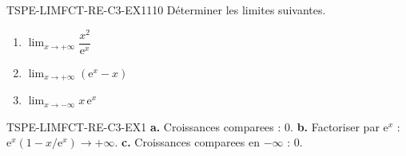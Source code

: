 

\begin{exercice}{TSPE-LIMFCT-RE-C3-EX1}{1}{10}
Déterminer les limites suivantes.
\begin{enumerate}
  \item $\lim_{x \to +\infty} \dfrac{x^2}{\mathrm{e}^x}$
  \item $\lim_{x \to +\infty} (\mathrm{e}^x - x)$
  \item $\lim_{x \to -\infty} x\,\mathrm{e}^x$
\end{enumerate}
\end{exercice}


\begin{corrige}{TSPE-LIMFCT-RE-C3-EX1}
\textbf{a.} Croissances comparees : $0$. \quad \textbf{b.} Factoriser par $\mathrm{e}^x$ : $\mathrm{e}^x(1-x/\mathrm{e}^x) \to +\infty$. \quad \textbf{c.} Croissances comparees en $-\infty$ : $0$.
\end{corrige}
